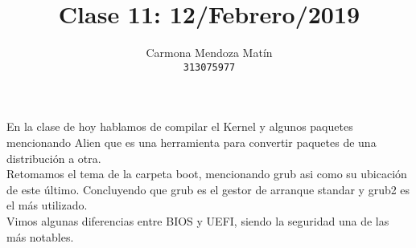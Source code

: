 \documentclass[11pt, a4paper]{report}
\begin{document}
\title{Clase 11: 12/Febrero/2019}
\author{
  Carmona Mendoza Mat\'in\\
  \texttt{313075977}
}
\date{}
\maketitle

En la clase de hoy hablamos de compilar el Kernel y algunos paquetes mencionando
Alien que es una herramienta para convertir paquetes de una distribución a otra.
\\

Retomamos el tema de la carpeta boot, mencionando grub asi como su ubicación de
este último. Concluyendo que grub es el gestor de arranque standar y grub2 es el
más utilizado. \\

Vimos algunas diferencias entre BIOS y UEFI, siendo la seguridad una de las más
notables.
\end{document}
